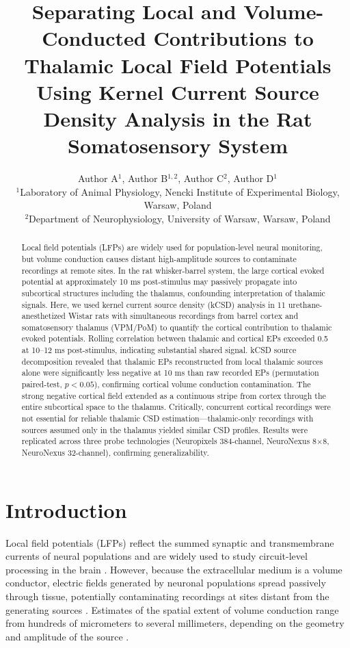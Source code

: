 \documentclass[12pt]{article}
\title{Separating Local and Volume-Conducted Contributions to Thalamic Local Field Potentials Using Kernel Current Source Density Analysis in the Rat Somatosensory System}
\author{Author A$^{1}$, Author B$^{1,2}$, Author C$^{2}$, Author D$^{1}$ \\
\small $^{1}$Laboratory of Animal Physiology, Nencki Institute of Experimental Biology, Warsaw, Poland \\
\small $^{2}$Department of Neurophysiology, University of Warsaw, Warsaw, Poland}
\date{}
\begin{document}
\maketitle

\begin{abstract}
Local field potentials (LFPs) are widely used for population-level neural monitoring, but volume conduction causes distant high-amplitude sources to contaminate recordings at remote sites. In the rat whisker-barrel system, the large cortical evoked potential at approximately 10 ms post-stimulus may passively propagate into subcortical structures including the thalamus, confounding interpretation of thalamic signals. Here, we used kernel current source density (kCSD) analysis in 11 urethane-anesthetized Wistar rats with simultaneous recordings from barrel cortex and somatosensory thalamus (VPM/PoM) to quantify the cortical contribution to thalamic evoked potentials. Rolling correlation between thalamic and cortical EPs exceeded 0.5 at 10--12 ms post-stimulus, indicating substantial shared signal. kCSD source decomposition revealed that thalamic EPs reconstructed from local thalamic sources alone were significantly less negative at 10 ms than raw recorded EPs (permutation paired-test, $p < 0.05$), confirming cortical volume conduction contamination. The strong negative cortical field extended as a continuous stripe from cortex through the entire subcortical space to the thalamus. Critically, concurrent cortical recordings were not essential for reliable thalamic CSD estimation---thalamic-only recordings with sources assumed only in the thalamus yielded similar CSD profiles. Results were replicated across three probe technologies (Neuropixels 384-channel, NeuroNexus 8$\times$8, NeuroNexus 32-channel), confirming generalizability.
\end{abstract}

\section{Introduction}

Local field potentials (LFPs) reflect the summed synaptic and transmembrane currents of neural populations and are widely used to study circuit-level processing in the brain \citep{buzsaki2012origin, einevoll2013modelling}. However, because the extracellular medium is a volume conductor, electric fields generated by neuronal populations spread passively through tissue, potentially contaminating recordings at sites distant from the generating sources \citep{katzner2009local}. Estimates of the spatial extent of volume conduction range from hundreds of micrometers to several millimeters, depending on the geometry and amplitude of the source \citep{mitzdorf1985current}.
\end{document}
